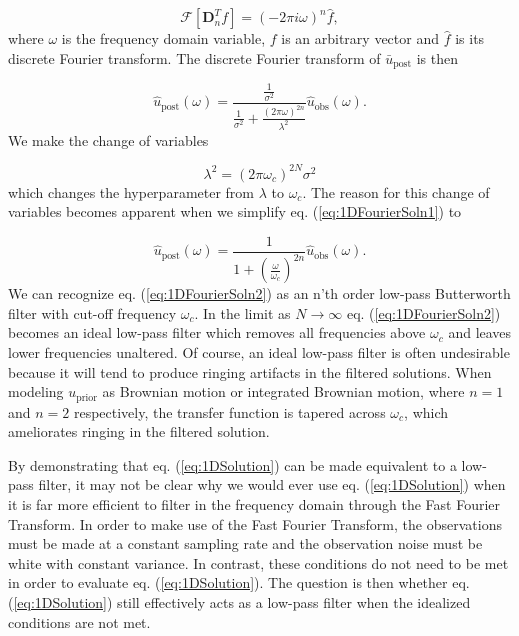 \documentclass[10pt,a4paper]{article}
\begin{document}
\begin{equation}\label{eq:Property2}
  \mathcal{F}[\mathbf{D}^T_nf] = (-2\pi i\omega)^n \hat{f},
\end{equation}
where $\omega$ is the frequency domain variable, $f$ is an arbitrary vector and $\hat{f}$ is its discrete Fourier transform.  The discrete Fourier transform of $\bar{u}_\mathrm{post}$ is then

\begin{equation}\label{eq:1DFourierSoln1}
\hat{u}_\mathrm{post}(\omega) = \frac{\frac{1}{\sigma^2}}
                                  {\frac{1}{\sigma^2} +                  
                                  \frac{(2\pi\omega)^{2n}}{\lambda^2}}
                                  \hat{u}_\mathrm{obs}(\omega).
\end{equation}
We make the change of variables 

\begin{equation}\label{eq:VariableChange}
\lambda^2 = (2\pi\omega_c)^{2N}\sigma^2
\end{equation}
which changes the hyperparameter from $\lambda$ to $\omega_c$.  The reason for this change of variables becomes apparent when we simplify eq. (\ref{eq:1DFourierSoln1}) to

\begin{equation}\label{eq:1DFourierSoln2}
\hat{u}_\mathrm{post}(\omega) = \frac{1}
                                  {1 + \left(\frac{\omega}{\omega_c}\right)^{2n}}
                                  \hat{u}_\mathrm{obs}(\omega).        
\end{equation}
We can recognize eq. (\ref{eq:1DFourierSoln2}) as an n'th order low-pass Butterworth filter with cut-off frequency $\omega_c$.  In the limit as $N\to \infty$ eq. (\ref{eq:1DFourierSoln2}) becomes an ideal low-pass filter which removes all frequencies above $\omega_c$ and leaves lower frequencies unaltered.  Of course, an ideal low-pass filter is often undesirable because it will tend to produce ringing artifacts in the filtered solutions.  When modeling $u_\mathrm{prior}$ as Brownian motion or integrated Brownian motion, where $n=1$ and $n=2$ respectively, the transfer function is tapered across $\omega_c$, which ameliorates ringing in the filtered solution.

By demonstrating that eq. (\ref{eq:1DSolution}) can be made equivalent to a low-pass filter, it may not be clear why we would ever use eq. (\ref{eq:1DSolution}) when it is far more efficient to filter in the frequency domain through the Fast Fourier Transform.  In order to make use of the Fast Fourier Transform, the observations must be made at a constant sampling rate and the observation noise must be  white with constant variance.  In contrast, these conditions do not need to be met in order to evaluate eq. (\ref{eq:1DSolution}).  The question is then whether eq. (\ref{eq:1DSolution}) still effectively acts as a low-pass filter when the idealized conditions are not met.  
\end{document}
